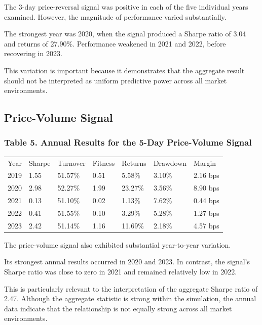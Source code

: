 \documentclass{article}
\begin{document}
The 3-day price-reversal signal was positive in each of the five individual years examined. However, the magnitude of performance varied substantially.

The strongest year was 2020, when the signal produced a Sharpe ratio of 3.04 and returns of 27.90\%. Performance weakened in 2021 and 2022, before recovering in 2023.

This variation is important because it demonstrates that the aggregate result should not be interpreted as uniform predictive power across all market environments.

\subsection{Price-Volume Signal}

\subsubsection{Table 5. Annual Results for the 5-Day Price-Volume Signal}

\begin{table}
\centering

\begin{tabular}{l l l l l l l}
Year & Sharpe & Turnover & Fitness & Returns & Drawdown & Margin \\

2019 & 1.55 & 51.57\% & 0.51 & 5.58\% & 3.10\% & 2.16 bps \\
2020 & 2.98 & 52.27\% & 1.99 & 23.27\% & 3.56\% & 8.90 bps \\
2021 & 0.13 & 51.10\% & 0.02 & 1.13\% & 7.62\% & 0.44 bps \\
2022 & 0.41 & 51.55\% & 0.10 & 3.29\% & 5.28\% & 1.27 bps \\
2023 & 2.42 & 51.14\% & 1.16 & 11.69\% & 2.18\% & 4.57 bps \\

\end{tabular}

\end{table}

The price-volume signal also exhibited substantial year-to-year variation.

Its strongest annual results occurred in 2020 and 2023. In contrast, the signal's Sharpe ratio was close to zero in 2021 and remained relatively low in 2022.

This is particularly relevant to the interpretation of the aggregate Sharpe ratio of 2.47. Although the aggregate statistic is strong within the simulation, the annual data indicate that the relationship is not equally strong across all market environments.
\end{document}
